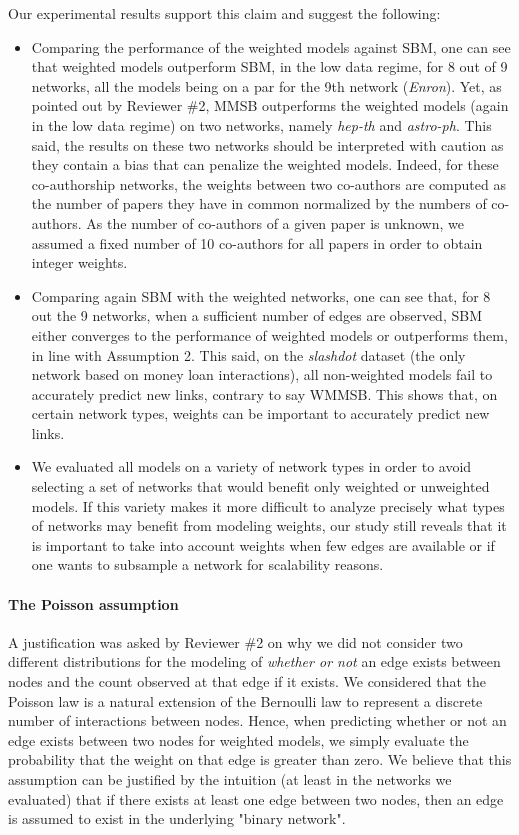 \documentclass{article}
\begin{document}
%
Our experimental results support this claim and suggest the following:
%
\begin{itemize}
\item Comparing the performance of the weighted models against SBM, one can see that weighted models outperform SBM, in the low data regime, for 8 out of 9 networks, all the models being on a par for the 9th network (\textit{Enron}). Yet, as pointed out by Reviewer \#2, MMSB outperforms the weighted models (again in the low data regime) on two networks, namely \textit{hep-th} and \textit{astro-ph}. This said, the results on these two networks should be interpreted with caution as they contain a bias that can penalize the weighted models. Indeed, for these co-authorship networks, the weights between two co-authors are computed as the number of papers they have in common normalized by the numbers of co-authors. As the number of co-authors of a given paper is unknown, we assumed a fixed number of 10 co-authors for all papers in order to obtain integer weights.
\item Comparing again SBM with the weighted networks, one can see that, for 8 out the 9 networks, when a sufficient number of edges are observed, SBM either converges to the performance of weighted models or outperforms them, in line with Assumption 2. This said, on the \textit{slashdot} dataset (the only network based on money loan interactions), all non-weighted models fail to accurately predict new links, contrary to say WMMSB. This shows that, on certain network types, weights can be important to accurately predict new links.
\item We evaluated all models on a variety of network types in order to avoid selecting a set of networks that would benefit only weighted or unweighted models. If this variety makes it more difficult to analyze precisely what types of networks may benefit from modeling weights, our study still reveals that it is important to take into account weights when few edges are available or if one wants to subsample a network for scalability reasons.
\end{itemize}

\paragraph{The Poisson assumption} A justification was asked by Reviewer \#2 on why we did not consider two different distributions for the modeling of \emph{whether or not} an edge exists between nodes and the count observed at that edge if it exists. We considered that the Poisson law is a natural extension of the Bernoulli law to represent a discrete number of interactions between nodes. Hence, when predicting whether or not an edge exists between two nodes for weighted models, we simply evaluate the probability that the weight on that edge is greater than zero. We believe that this assumption can be justified by the intuition (at least in the networks we evaluated) that if there exists at least one edge between two nodes, then an edge is assumed to exist in the underlying "binary network".
\end{document}
